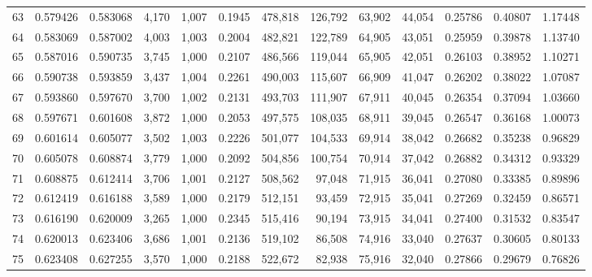 \begin{tabular}{rrrrrrrrrrrrr}
63  &  0.579426 &  0.583068 &   4,170 &  1,007 &                                     0.1945 &  478,818 &  126,792 &   63,902 &   44,054 &  0.25786 &  0.40807 &  1.17448 \\
64  &  0.583069 &  0.587002 &   4,003 &  1,003 &                                     0.2004 &  482,821 &  122,789 &   64,905 &   43,051 &  0.25959 &  0.39878 &  1.13740 \\
65  &  0.587016 &  0.590735 &   3,745 &  1,000 &                                     0.2107 &  486,566 &  119,044 &   65,905 &   42,051 &  0.26103 &  0.38952 &  1.10271 \\
66  &  0.590738 &  0.593859 &   3,437 &  1,004 &                                     0.2261 &  490,003 &  115,607 &   66,909 &   41,047 &  0.26202 &  0.38022 &  1.07087 \\
67  &  0.593860 &  0.597670 &   3,700 &  1,002 &                                     0.2131 &  493,703 &  111,907 &   67,911 &   40,045 &  0.26354 &  0.37094 &  1.03660 \\
68  &  0.597671 &  0.601608 &   3,872 &  1,000 &                                     0.2053 &  497,575 &  108,035 &   68,911 &   39,045 &  0.26547 &  0.36168 &  1.00073 \\
69  &  0.601614 &  0.605077 &   3,502 &  1,003 &                                     0.2226 &  501,077 &  104,533 &   69,914 &   38,042 &  0.26682 &  0.35238 &  0.96829 \\
70  &  0.605078 &  0.608874 &   3,779 &  1,000 &                                     0.2092 &  504,856 &  100,754 &   70,914 &   37,042 &  0.26882 &  0.34312 &  0.93329 \\
71  &  0.608875 &  0.612414 &   3,706 &  1,001 &                                     0.2127 &  508,562 &   97,048 &   71,915 &   36,041 &  0.27080 &  0.33385 &  0.89896 \\
72  &  0.612419 &  0.616188 &   3,589 &  1,000 &                                     0.2179 &  512,151 &   93,459 &   72,915 &   35,041 &  0.27269 &  0.32459 &  0.86571 \\
73  &  0.616190 &  0.620009 &   3,265 &  1,000 &                                     0.2345 &  515,416 &   90,194 &   73,915 &   34,041 &  0.27400 &  0.31532 &  0.83547 \\
74  &  0.620013 &  0.623406 &   3,686 &  1,001 &                                     0.2136 &  519,102 &   86,508 &   74,916 &   33,040 &  0.27637 &  0.30605 &  0.80133 \\
75  &  0.623408 &  0.627255 &   3,570 &  1,000 &                                     0.2188 &  522,672 &   82,938 &   75,916 &   32,040 &  0.27866 &  0.29679 &  0.76826 \\

\end{tabular}
